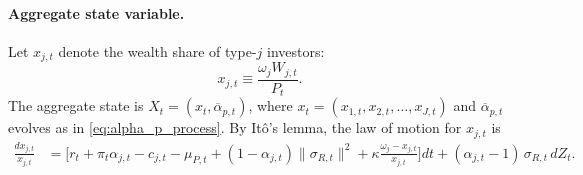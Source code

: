 \paragraph{Aggregate state variable.} 

Let $x_{j,t}$ denote the wealth share of type-$j$ investors:
\begin{equation}\nonumber
    x_{j,t} \equiv \frac{\omega_j W_{j,t}}{P_t}.
\end{equation}
The aggregate state is $X_t = (x_t, \overline{\alpha}_{p,t})$, where $x_t = (x_{1,t}, x_{2,t}, \ldots, x_{J,t})$ and $\overline{\alpha}_{p,t}$ evolves as in \eqref{eq:alpha_p_process}. By Itô’s lemma, the law of motion for $x_{j,t}$ is
\begin{align*}
    \frac{dx_{j,t}}{x_{j,t}} 
    &= \Big[ r_t + \pi_t \alpha_{j,t} - c_{j,t} - \mu_{P,t} 
        + (1-\alpha_{j,t}) \|\sigma_{R,t}\|^2 
        + \kappa \frac{\omega_j - x_{j,t}}{x_{j,t}} \Big] dt  + (\alpha_{j,t} - 1)\, \sigma_{R,t}\, dZ_t.
\end{align*}


